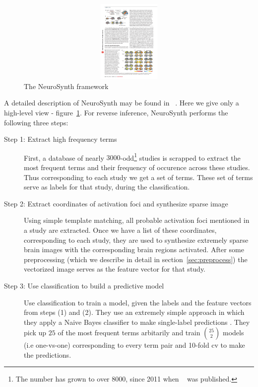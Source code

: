 \documentclass{article} %
\begin{document}
\begin{figure}[h]
\begin{center}
\includegraphics[height=4cm, width=14cm]{3steps.pdf}
\end{center}
\caption{The NeuroSynth framework~\cite{yarkoni2011large}}
\label{fig:3steps}
\end{figure}

A detailed description of NeuroSynth may be found in ~\cite{yarkoni2011large}. Here we give only a high-level view  - figure~\ref{fig:3steps}.  For reverse inference, NeuroSynth performs the following three steps:
\begin{description}
\item[Step 1:  Extract high frequency terms] First, a database of nearly $3000$-odd\footnote{The number has grown to over $8000$, since 2011 when ~\cite{yarkoni2011large} was published.} studies is scrapped to extract the most frequent terms and their frequency of occurence across these studies. Thus corresponding to each study we get a set of terms. These set of terms serve as labels for that study, during the classification.
\item[Step 2: Extract coordinates of activation foci and synthesize sparse image] Using simple template matching, all probable activation foci mentioned in a study are extracted. Once we have a list of these coordinates, corresponding to each study, they are used to synthesize extremely sparse brain images with the corresponding brain regions activated. After some preprocessing (which we describe in detail in section~\ref{sec:preprocess}) the vectorized image serves as the feature vector for that study.
\item[Step 3: Use classification to build a predictive model]  Use classification to train a model, given the labels and the feature vectors from steps (1) and (2). They use an extremely simple approach in which they apply a Naive Bayes classifier to make single-label predictions . They pick up $25$ of the most frequent terms arbitarily and train $25 \choose 2$ models (i.e one-vs-one) corresponding to every term pair and 10-fold cv to make the predictions.
\end{description}
\end{document}
